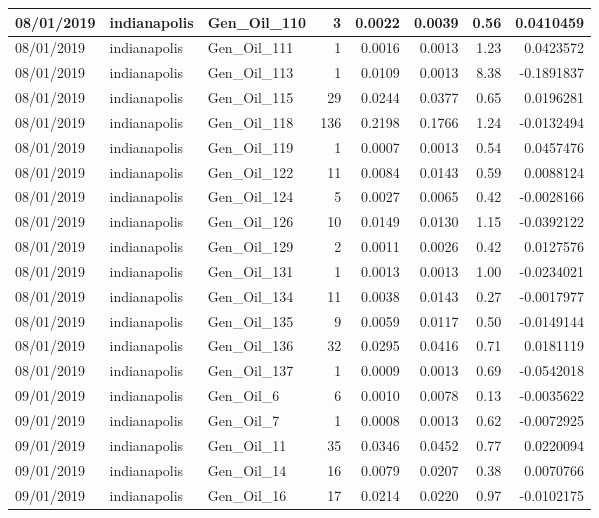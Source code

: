 \documentclass[
  letterpaper,
  DIV=11,
  numbers=noendperiod]{scrartcl}
\begin{document}
\begin{tabular}{l|l|l|r|r|r|r|r}
\hline
08/01/2019 & indianapolis & Gen\_Oil\_110 & 3 & 0.0022 & 0.0039 & 0.56 & 0.0410459\\
\hline
08/01/2019 & indianapolis & Gen\_Oil\_111 & 1 & 0.0016 & 0.0013 & 1.23 & 0.0423572\\
\hline
08/01/2019 & indianapolis & Gen\_Oil\_113 & 1 & 0.0109 & 0.0013 & 8.38 & -0.1891837\\
\hline
08/01/2019 & indianapolis & Gen\_Oil\_115 & 29 & 0.0244 & 0.0377 & 0.65 & 0.0196281\\
\hline
08/01/2019 & indianapolis & Gen\_Oil\_118 & 136 & 0.2198 & 0.1766 & 1.24 & -0.0132494\\
\hline
08/01/2019 & indianapolis & Gen\_Oil\_119 & 1 & 0.0007 & 0.0013 & 0.54 & 0.0457476\\
\hline
08/01/2019 & indianapolis & Gen\_Oil\_122 & 11 & 0.0084 & 0.0143 & 0.59 & 0.0088124\\
\hline
08/01/2019 & indianapolis & Gen\_Oil\_124 & 5 & 0.0027 & 0.0065 & 0.42 & -0.0028166\\
\hline
08/01/2019 & indianapolis & Gen\_Oil\_126 & 10 & 0.0149 & 0.0130 & 1.15 & -0.0392122\\
\hline
08/01/2019 & indianapolis & Gen\_Oil\_129 & 2 & 0.0011 & 0.0026 & 0.42 & 0.0127576\\
\hline
08/01/2019 & indianapolis & Gen\_Oil\_131 & 1 & 0.0013 & 0.0013 & 1.00 & -0.0234021\\
\hline
08/01/2019 & indianapolis & Gen\_Oil\_134 & 11 & 0.0038 & 0.0143 & 0.27 & -0.0017977\\
\hline
08/01/2019 & indianapolis & Gen\_Oil\_135 & 9 & 0.0059 & 0.0117 & 0.50 & -0.0149144\\
\hline
08/01/2019 & indianapolis & Gen\_Oil\_136 & 32 & 0.0295 & 0.0416 & 0.71 & 0.0181119\\
\hline
08/01/2019 & indianapolis & Gen\_Oil\_137 & 1 & 0.0009 & 0.0013 & 0.69 & -0.0542018\\
\hline
09/01/2019 & indianapolis & Gen\_Oil\_6 & 6 & 0.0010 & 0.0078 & 0.13 & -0.0035622\\
\hline
09/01/2019 & indianapolis & Gen\_Oil\_7 & 1 & 0.0008 & 0.0013 & 0.62 & -0.0072925\\
\hline
09/01/2019 & indianapolis & Gen\_Oil\_11 & 35 & 0.0346 & 0.0452 & 0.77 & 0.0220094\\
\hline
09/01/2019 & indianapolis & Gen\_Oil\_14 & 16 & 0.0079 & 0.0207 & 0.38 & 0.0070766\\
\hline
09/01/2019 & indianapolis & Gen\_Oil\_16 & 17 & 0.0214 & 0.0220 & 0.97 & -0.0102175\\

\end{tabular}
\end{document}
